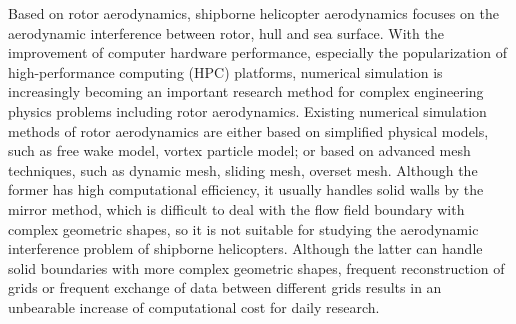 \begin{eabstract}
Based on rotor aerodynamics, shipborne helicopter aerodynamics focuses on the aerodynamic interference between rotor, hull and sea surface.
With the improvement of computer hardware performance, especially the popularization of high-performance computing (HPC) platforms, numerical simulation is increasingly becoming an important research method for complex engineering physics problems including rotor aerodynamics.
Existing numerical simulation methods of rotor aerodynamics are either based on simplified physical models, such as free wake model, vortex particle model; or based on advanced mesh techniques, such as dynamic mesh, sliding mesh, overset mesh.
Although the former has high computational efficiency, it usually handles solid walls by the mirror method, which is difficult to deal with the flow field boundary with complex geometric shapes, so it is not suitable for studying the aerodynamic interference problem of shipborne helicopters.
Although the latter can handle solid boundaries with more complex geometric shapes, frequent reconstruction of grids or frequent exchange of data between different grids results in an unbearable increase of computational cost for daily research.


\end{eabstract}
